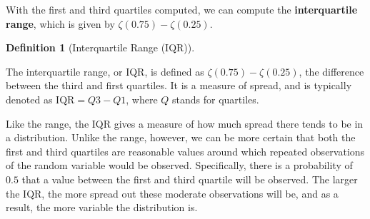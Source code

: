 \documentclass[
  letterpaper,
  DIV=11,
  numbers=noendperiod]{scrreprt}
\theoremstyle{definition}
\theoremstyle{definition}
\theoremstyle{definition}
\newtheorem{definition}{Definition}[chapter]
\theoremstyle{remark}
\begin{document}
With the first and third quartiles computed, we can compute the
\textbf{interquartile range}, which is given by
\(\zeta(0.75)-\zeta(0.25)\).

\begin{definition}[Interquartile Range
(IQR)]\protect\hypertarget{def-iqr}{}\label{def-iqr}

The interquartile range, or IQR, is defined as
\(\zeta(0.75) - \zeta(0.25)\), the difference between the third and
first quartiles. It is a measure of spread, and is typically denoted as
\(\text{IQR} = Q3 - Q1\), where \(Q\) stands for quartiles.

\end{definition}

Like the range, the IQR gives a measure of how much spread there tends
to be in a distribution. Unlike the range, however, we can be more
certain that both the first and third quartiles are reasonable values
around which repeated observations of the random variable would be
observed. Specifically, there is a probability of \(0.5\) that a value
between the first and third quartile will be observed. The larger the
\(\text{IQR}\), the more spread out these moderate observations will be,
and as a result, the more variable the distribution is.
\end{document}
